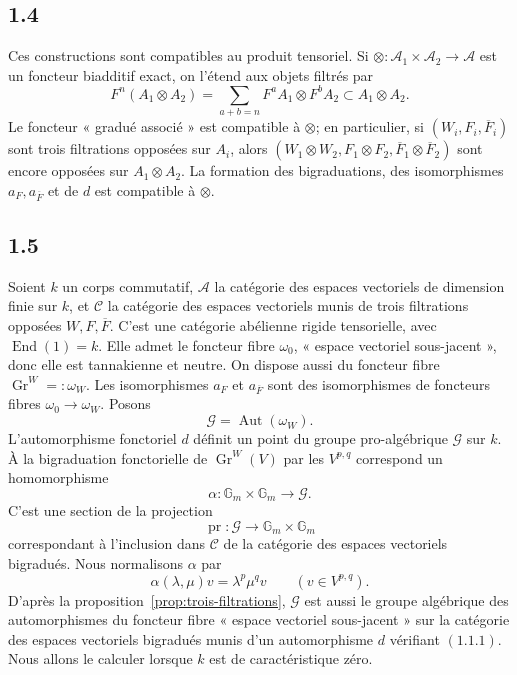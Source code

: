 \documentclass[11pt]{article}
\newcommand{\Gr}{\operatorname{Gr}}
\newcommand{\Aut}{\operatorname{Aut}}
\newcommand{\End}{\operatorname{End}}
\newcommand{\Gm}{\mathbb G_m}
\begin{document}
\subsection*{1.4}
Ces constructions sont compatibles au produit tensoriel. Si \(\otimes:\mathcal A_1\times\mathcal A_2\to\mathcal A\) est un foncteur biadditif exact, on l'étend aux objets filtrés par
\[
 F^n(A_1\otimes A_2)=\sum_{a+b=n}F^aA_1\otimes F^bA_2\subset A_1\otimes A_2.
\]
Le foncteur « gradué associé » est compatible à \(\otimes\); en particulier, si \((W_i,F_i,\overline F_i)\) sont trois filtrations opposées sur \(A_i\), alors \((W_1\otimes W_2,F_1\otimes F_2,\overline F_1\otimes\overline F_2)\) sont encore opposées sur \(A_1\otimes A_2\). La formation des bigraduations, des isomorphismes \(a_F,a_{\overline F}\) et de \(d\) est compatible à \(\otimes\).


\subsection*{1.5}
Soient \(k\) un corps commutatif, \(\mathcal A\) la catégorie des espaces vectoriels de dimension finie sur \(k\), et \(\mathcal C\) la catégorie des espaces vectoriels munis de trois filtrations opposées \(W,F,\overline F\). C'est une catégorie abélienne rigide tensorielle, avec \(\End(1)=k\). Elle admet le foncteur fibre \(\omega_0\), « espace vectoriel sous-jacent », donc elle est tannakienne et neutre. On dispose aussi du foncteur fibre \(\Gr^W=:\omega_W\). Les isomorphismes \(a_F\) et \(a_{\overline F}\) sont des isomorphismes de foncteurs fibres \(\omega_0\to\omega_W\). Posons
\[
 \mathcal G=\Aut(\omega_W).
\]
L'automorphisme fonctoriel \(d\) définit un point du groupe pro-algébrique \(\mathcal G\) sur \(k\). À la bigraduation fonctorielle de \(\Gr^W(V)\) par les \(V^{p,q}\) correspond un homomorphisme
\[
 \alpha:\Gm\times\Gm\longrightarrow\mathcal G.
\]
C'est une section de la projection
\[
 \operatorname{pr}:\mathcal G\longrightarrow\Gm\times\Gm
\]
correspondant à l'inclusion dans \(\mathcal C\) de la catégorie des espaces vectoriels bigradués. Nous normalisons \(\alpha\) par
\[
 \alpha(\lambda,\mu)v=\lambda^p\mu^qv\qquad (v\in V^{p,q}).
\]
D'après la proposition~\ref{prop:trois-filtrations}, \(\mathcal G\) est aussi le groupe algébrique des automorphismes du foncteur fibre « espace vectoriel sous-jacent » sur la catégorie des espaces vectoriels bigradués munis d'un automorphisme \(d\) vérifiant \((1.1.1)\). Nous allons le calculer lorsque \(k\) est de caractéristique zéro.
\end{document}
